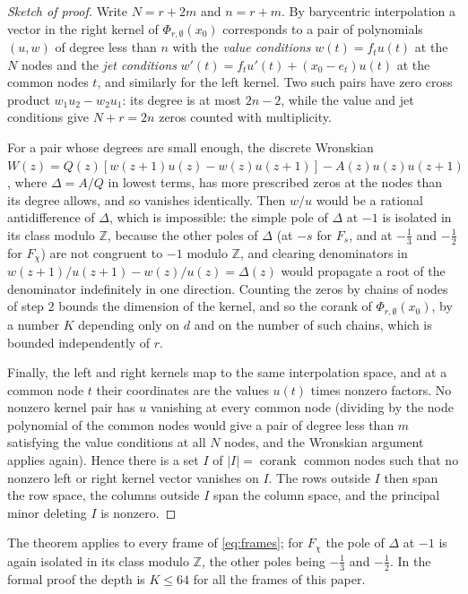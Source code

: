 \documentclass[11pt]{amsart}
\theoremstyle{definition}
\theoremstyle{remark}
\numberwithin{equation}{section}
\newcommand{\Z}{\mathbb Z}
\newcommand{\corank}{\operatorname{corank}}
\begin{document}
\begin{proof}[Sketch of proof]
Write $N=r+2m$ and $n=r+m$. By barycentric interpolation a vector in the right kernel of $\Phi_{r,\emptyset}(x_0)$ corresponds to a
pair of polynomials $(u,w)$ of degree less than $n$ with the \emph{value conditions} $w(t)=f_tu(t)$ at the $N$ nodes and the
\emph{jet conditions} $w'(t)=f_tu'(t)+(x_0-e_t)u(t)$ at the common nodes $t$, and similarly for the left kernel. Two such pairs
have zero cross product $w_1u_2-w_2u_1$: its degree is at most $2n-2$, while the value and jet conditions give $N+r=2n$ zeros
counted with multiplicity.

For a pair whose degrees are small enough, the discrete Wronskian
$W(z)=Q(z)[w(z+1)u(z)-w(z)u(z+1)]-A(z)u(z)u(z+1)$, where $\Delta=A/Q$ in lowest terms, has more prescribed zeros at the
nodes than its degree allows, and so vanishes identically. Then $w/u$ would be a rational antidifference of $\Delta$, which
is impossible: the simple pole of $\Delta$ at $-1$ is isolated in its class modulo $\Z$, because the other poles of $\Delta$
(at $-s$ for $F_s$, and at $-\frac13$ and $-\frac12$ for $F_\chi$) are not congruent to $-1$ modulo $\Z$, and clearing
denominators in $w(z+1)/u(z+1)-w(z)/u(z)=\Delta(z)$ would propagate a root of
the denominator indefinitely in one direction. Counting the zeros by chains of nodes of step $2$ bounds the dimension of
the kernel, and so the corank of $\Phi_{r,\emptyset}(x_0)$, by a number $K$ depending only on $d$ and on the number of such
chains, which is bounded independently of $r$.

Finally, the left and right kernels map to the same interpolation space, and at a common node $t$ their coordinates are the
values $u(t)$ times nonzero factors. No nonzero kernel pair has $u$ vanishing at every common node (dividing by the node
polynomial of the common nodes would give a pair of degree less than $m$ satisfying the value conditions at all $N$ nodes,
and the Wronskian argument applies again). Hence there is a set $I$ of $|I|=\corank$ common nodes such that no nonzero left
or right kernel vector vanishes on $I$. The rows outside $I$ then span the row space, the columns outside $I$ span the
column space, and the principal minor deleting $I$ is nonzero.
\end{proof}

The theorem applies to every frame of \eqref{eq:frames}; for $F_\chi$ the pole of $\Delta$ at $-1$ is again isolated in its
class modulo $\Z$, the other poles being $-\frac13$ and $-\frac12$. In the formal proof the depth is $K\le64$ for all the
frames of this paper.
\end{document}
